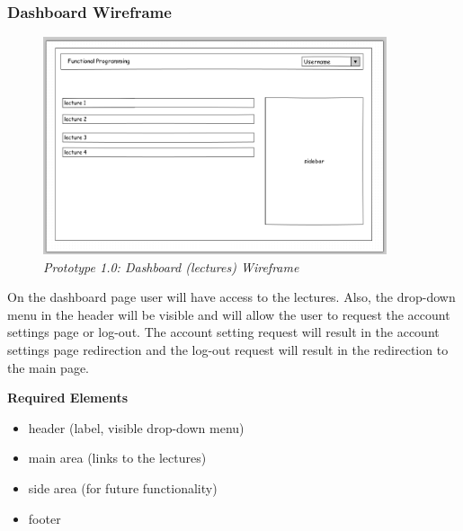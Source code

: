 \documentclass[12pt,twoside,a4paper]{report}
\begin{document}
\subsubsection{Dashboard Wireframe}\label{3.7.1.2}
\begin{figure}[!ht]
	\centering
		\includegraphics[width=0.9\textwidth, totalheight=7cm]
		{wireframe_dashboard}
	\caption{\textit{Prototype 1.0: Dashboard (lectures) Wireframe}}
	\label{f3.7.1.2}
\end{figure}

On the dashboard page user will have access to the lectures. Also, the drop-down menu in the header will be visible and will allow the user to request the account settings page or log-out. The account setting request will result in the account settings page redirection and the log-out request will result in the redirection to the main page.

\textbf{Required Elements}
\begin{itemize}
\item header (label, visible drop-down menu)
\item main area (links to the lectures)
\item side area (for future functionality)
\item footer
\end{itemize}
\end{document}
